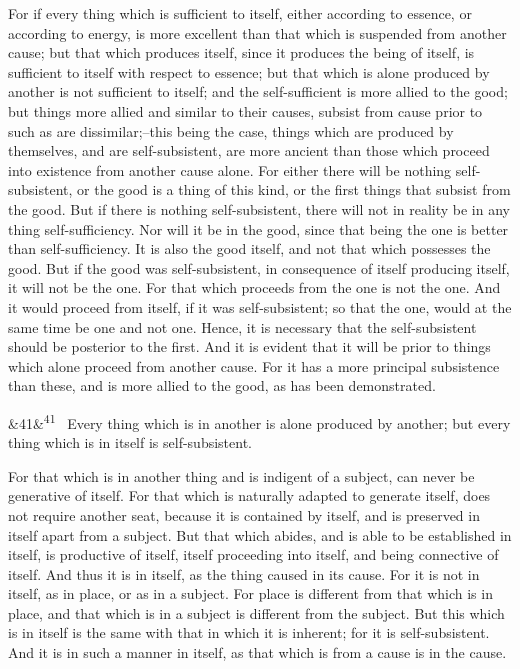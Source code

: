 \documentclass[12pt]{article}
\newcommand{\para}[1][]{\par\noindent\ifx&#1&\else\textsuperscript{\footnotesize #1}~\fi}
\begin{document}
For if every thing which is sufficient to itself, either according to essence, or according to energy, is more excellent than that which is suspended from another cause; but that which produces itself, since it produces the being of itself, is sufficient to itself with respect to essence; but that which is alone produced by another is not sufficient to itself; and the self-sufficient is more allied to the good; but things more allied and similar to their causes, subsist from cause prior to such as are dissimilar;--this being the case, things which are produced by themselves, and are self-subsistent, are more ancient than those which proceed into existence from another cause alone. For either there will be nothing self-subsistent, or the good is a thing of this kind, or the first things that subsist from the good. But if there is nothing self-subsistent, there will not in reality be in any thing self-sufficiency. Nor will it be in the good, since that being the one is better than self-sufficiency. It is also the good itself, and not that which possesses the good. But if the good was self-subsistent, in consequence of itself producing itself, it will not be the one. For that which proceeds from the one is not the one. And it would proceed from itself, if it was self-subsistent; so that the one, would at the same time be one and not one. Hence, it is necessary that the self-subsistent should be posterior to the first. And it is evident that it will be prior to things which alone proceed from another cause. For it has a more principal subsistence than these, and is more allied to the good, as has been demonstrated.

\para[41] Every thing which is in another is alone produced by another; but every thing which is in itself is self-subsistent.

For that which is in another thing and is indigent of a subject, can never be generative of itself. For that which is naturally adapted to generate itself, does not require another seat, because it is contained by itself, and is preserved in itself apart from a subject. But that which abides, and is able to be established in itself, is productive of itself, itself proceeding into itself, and being connective of itself. And thus it is in itself, as the thing caused in its cause. For it is not in itself, as in place, or as in a subject. For place is different from that which is in place, and that which is in a subject is different from the subject. But this which is in itself is the same with that in which it is inherent; for it is self-subsistent. And it is in such a manner in itself, as that which is from a cause is in the cause.
\end{document}
